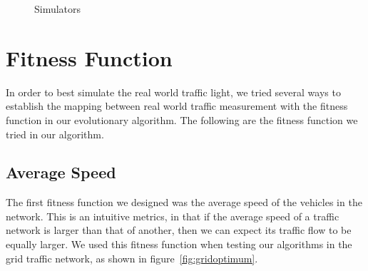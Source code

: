 \documentclass{article} %
\begin{document}
\begin{figure}[h]
 \centering
  \caption{Simulators}
   \label{fig:simulator} %
\end{figure}


\section{Fitness Function}
In order to best simulate the real world traffic light, we tried several ways to establish the mapping between real world traffic measurement with the fitness function in our evolutionary algorithm. The following are the fitness function we tried in our algorithm.
\subsection{Average Speed}
The first fitness function we designed was the average speed of the vehicles in the network. This is an intuitive metrics, in that if the average speed of a traffic network is larger than that of another, then we can expect its traffic flow to be equally larger. We used this fitness function when testing our algorithms in the grid traffic network, as shown in figure~\ref{fig:gridoptimum}.
\end{document}

